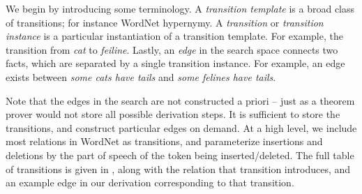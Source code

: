 %
%
We begin by introducing some terminology.
A \textit{transition template} is a broad class of transitions; for
  instance WordNet hypernymy.
A \textit{transition} or \textit{transition instance} is a particular
  instantiation of a transition template.
For example, the transition from \textit{cat} to \textit{feiline}.
Lastly, an \textit{edge} in the search space connects two facts, which
  are separated by a single transition instance.
For example, an edge exists between 
  \textit{some cats have tails} and \textit{some felines have tails}.

Note that the edges in the search are not constructed a priori --
  just as a theorem prover would not store all possible derivation steps.
It is sufficient to store the transitions, and construct particular
  edges on demand.
At a high level, we include most relations in WordNet as transitions,
  and parameterize insertions and deletions by the part of speech
  of the token being inserted/deleted.
The full table of transitions is given in , along
  with the relation that transition introduces, and an example edge
  in our derivation corresponding to that transition.

